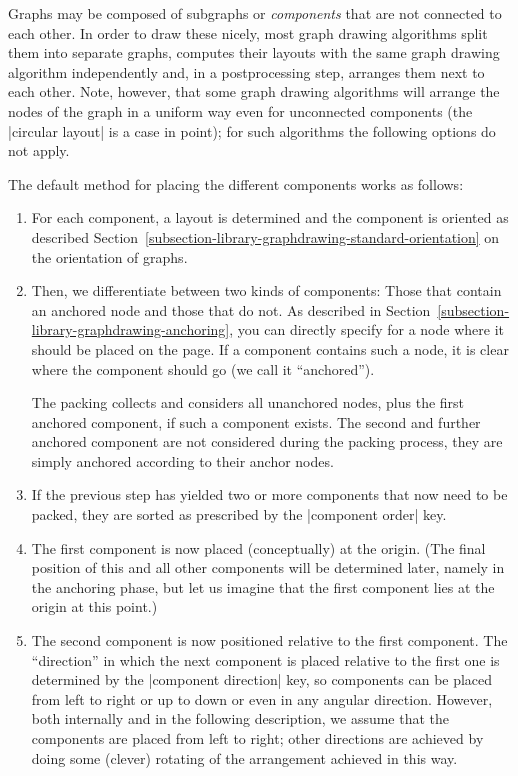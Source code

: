\label{subsection-gd-component-packing}

Graphs may be composed of subgraphs or \emph{components} that are not
connected to each other. In order to draw these nicely, most graph
drawing algorithms split them into separate graphs, computes
their layouts with the same graph drawing algorithm independently and,
in a postprocessing step, arranges them next to each other. Note,
however, that some graph drawing algorithms will arrange the nodes of
the graph in a uniform way even for unconnected components (the
|circular layout| is a case in point); for such 
algorithms the following options do not apply.

The default method for placing the different components works as
follows:

\begin{enumerate}
\item For each component, a layout is determined and the component is
  oriented as described
  Section~\ref{subsection-library-graphdrawing-standard-orientation}
  on the orientation of graphs. 
\item Then, we differentiate between two kinds of components: Those
  that contain an anchored node and those that do not. As described in
  Section~\ref{subsection-library-graphdrawing-anchoring}, you can
  directly specify for a node where it should be placed on the
  page. If a component contains such a node, it is clear where the
  component should go (we call it ``anchored'').
  
  The packing collects and considers all unanchored nodes, plus the
  first anchored component, if such a component exists. The second and
  further anchored component are not considered during the packing
  process, they are simply anchored according to their anchor nodes. 
\item If the previous step has yielded two or more components that now
  need to be packed, they are sorted as prescribed by the
  |component order| key.
\item The first component is now placed (conceptually) at the
  origin. (The final position of this and all other components will be
  determined later, namely in the anchoring phase, but let us imagine
  that the first component lies at the origin at this point.)
\item The second component is now positioned relative to the first
  component. The ``direction'' in which the next component is placed
  relative to the first one is determined by the |component direction|
  key, so components can be placed from left to right or up to down or
  even in any angular direction. However, both internally and in the
  following description, we assume that the components are placed from
  left to right; other directions are achieved by doing some (clever)
  rotating of the arrangement achieved in this way.


\end{enumerate}

